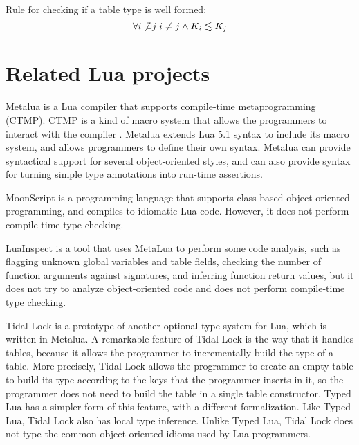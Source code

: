 Rule for checking if a table type is well formed:
\[
\forall i \not\exists j \; i \not= j \wedge K_{i} \lesssim K_{j}
\]

\section{Related Lua projects}
\label{sec:related}

Metalua \citep{metalua} is a Lua compiler that supports compile-time
metaprogramming (CTMP).
CTMP is a kind of macro system that allows the programmers to interact
with the compiler \citep{fleutot2007contrasting}. 
Metalua extends Lua 5.1 syntax to include its macro system,
and allows programmers to define their own syntax.
Metalua can provide syntactical support for several object-oriented
styles, and can also provide syntax for turning simple type
annotations into run-time assertions.

MoonScript \citep{moonscript} is a programming language that supports
class-based object-oriented programming, and compiles to idiomatic
Lua code.
However, it does not perform compile-time type checking.

LuaInspect \citep{luainspect} is a tool that uses MetaLua to perform
some code analysis, such as flagging unknown global variables and
table fields, checking the number of function arguments against
signatures, and inferring function return values, but it does not
try to analyze object-oriented code and does not perform compile-time
type checking.

Tidal Lock \citep{tidallock} is a prototype of another optional type
system for Lua, which is written in Metalua.
A remarkable feature of Tidal Lock is the way that it handles tables,
because it allows the programmer to incrementally build the type of
a table.
More precisely, Tidal Lock allows the programmer to create an empty
table to build its type according to the keys that the programmer
inserts in it, so the programmer does not need to build the table in
a single table constructor.
Typed Lua has a simpler form of this feature, with a different
formalization.
Like Typed Lua, Tidal Lock also has local type inference.
Unlike Typed Lua, Tidal Lock does not type the common object-oriented
idioms used by Lua programmers.

